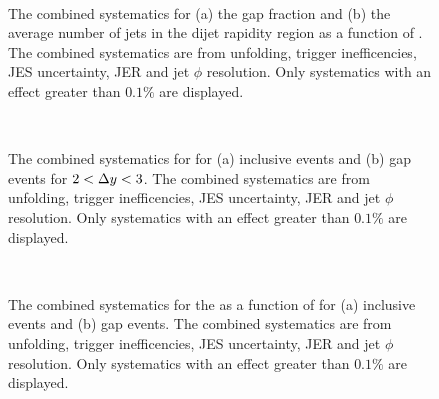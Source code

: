 \begin{figure}
\centering
\mbox{
              \quad
              \quad
                              }
\caption[Combined systematics for the gap fraction and average number of jets]{
The combined systematics for (a) the gap fraction and (b) the average number of jets in the dijet rapidity region as a function of \dy{}.
The combined systematics are from unfolding, trigger inefficencies, JES uncertainty, JER and jet $\phi$ resolution.
Only systematics with an effect greater than $0.1\%$ are displayed.
\label{GBJ2:SysComb:GapNjet}}
\end{figure}
\begin{figure}
\centering
\mbox{
              \quad
              \quad
                              }

\caption[Combined systematics for \dphiDist{}]{
The combined systematics for \dphiDist{}  for (a) inclusive events and (b) gap events for  $2<\mbox{$\Delta y$}{}<3$.
The combined systematics are from unfolding, trigger inefficencies, JES uncertainty, JER and jet $\phi$ resolution.
Only systematics with an effect greater than $0.1\%$ are displayed.
\label{GBJ2:SysComb:dphi23}}
\end{figure}


\begin{figure}
\centering
\mbox{
              \quad
              \quad
                              }
\caption[Combined systematics for \mean{\costwodphi{}}]{
The combined systematics for the \mean{\costwodphi{}} as a function of \dy{}  for (a) inclusive events and (b) gap events.
The combined systematics are from unfolding, trigger inefficencies, JES uncertainty, JER and jet $\phi$ resolution.
Only systematics with an effect greater than $0.1\%$ are displayed.
\label{GBJ2:SysComb:cos2}}
\end{figure}

